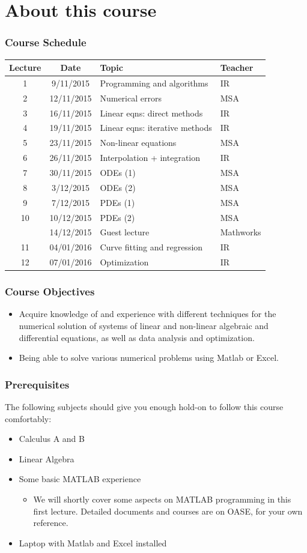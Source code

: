 \documentclass[11pt,table,final,fleqn,xcolor={usenames,dvipsnames}]{beamer}
\begin{document}
\section{About this course}
\begin{frame}
 \frametitle{Course Schedule}
 \begin{tabular}{ccll}
 \hline
 Lecture & Date & Topic & Teacher \\ 
 \hline
 1 & 9/11/2015 & Programming and algorithms & IR \\ 
 2 & 12/11/2015 & Numerical errors & MSA \\ 
 3 & 16/11/2015 & Linear eqns: direct methods & IR\\ 
 4 & 19/11/2015 & Linear eqns: iterative methods & IR\\ 
 5 & 23/11/2015 & Non-linear equations & MSA\\ 
 6 & 26/11/2015 & Interpolation + integration & IR\\ 
 7 & 30/11/2015 & ODEs (1) & MSA\\ 
 8 & 3/12/2015 & ODEs (2) & MSA\\ 
 9 & 7/12/2015 & PDEs (1) & MSA\\ 
 10 & 10/12/2015 & PDEs (2) & MSA\\ 
  & 14/12/2015 & Guest lecture & Mathworks \\ 
 11 & 04/01/2016 & Curve fitting and regression & IR\\ 
 12 & 07/01/2016 & Optimization & IR\\ 
 \hline
 \end{tabular} 
\end{frame}

\begin{frame}
 \frametitle{Course Objectives}
 \begin{itemize}
  \item Acquire knowledge of and experience with different techniques for the numerical solution of systems of linear and non-linear algebraic and differential equations, as well as data analysis and optimization.
  \item Being able to solve various numerical problems using Matlab or Excel. 
 \end{itemize}
\end{frame}

\begin{frame}
 \frametitle{Prerequisites}
  The following subjects should give you enough hold-on to follow this course comfortably:
 \begin{itemize}
   \item Calculus A and B
   \item Linear Algebra
   \item Some basic MATLAB experience
     \begin{itemize}
       \item We will shortly cover some aspects on MATLAB programming in this first lecture. Detailed documents and courses are on OASE, for your own reference.
     \end{itemize}
   \item Laptop with Matlab and Excel installed
 \end{itemize}
\end{frame}
\end{document}
